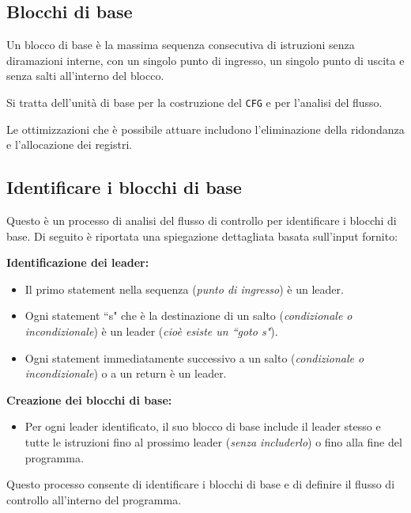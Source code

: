 \subsection{Blocchi di base}
\begin{tcolorbox}[title=Blocco di base]
  Un blocco di base è la massima sequenza consecutiva di istruzioni senza 
  diramazioni interne, con un singolo punto di ingresso, un singolo punto di uscita
  e senza salti all'interno del blocco.
\end{tcolorbox}
Si tratta dell'unità di base per la costruzione del \verb|CFG| e per l'analisi del flusso.

Le ottimizzazioni che è possibile attuare includono
l'eliminazione della ridondanza e l'allocazione dei registri.
\subsection{Identificare i blocchi di base}
Questo è un processo di analisi del flusso di controllo per identificare i blocchi di base. Di seguito è riportata una spiegazione dettagliata basata sull'input fornito:

\textbf{Identificazione dei leader:}
\begin{itemize}[label=--,topsep=0pt,itemsep=0pt]
  \item Il primo statement nella sequenza (\textit{punto di ingresso}) è un leader.
  \item Ogni statement ``s" che è la destinazione di un salto
  (\textit{condizionale o incondizionale}) è un leader (\textit{cioè esiste un ``goto s"}).
  \item Ogni statement immediatamente successivo a un salto
  (\textit{condizionale o incondizionale}) o a un return è un leader.
\end{itemize}

\textbf{Creazione dei blocchi di base:}
\begin{itemize}
  \item Per ogni leader identificato, il suo blocco di base include
  il leader stesso e tutte le istruzioni fino al prossimo leader
  (\textit{senza includerlo}) o fino alla fine del programma.
\end{itemize}

Questo processo consente di identificare i blocchi di base e di definire
il flusso di controllo all'interno del programma.

